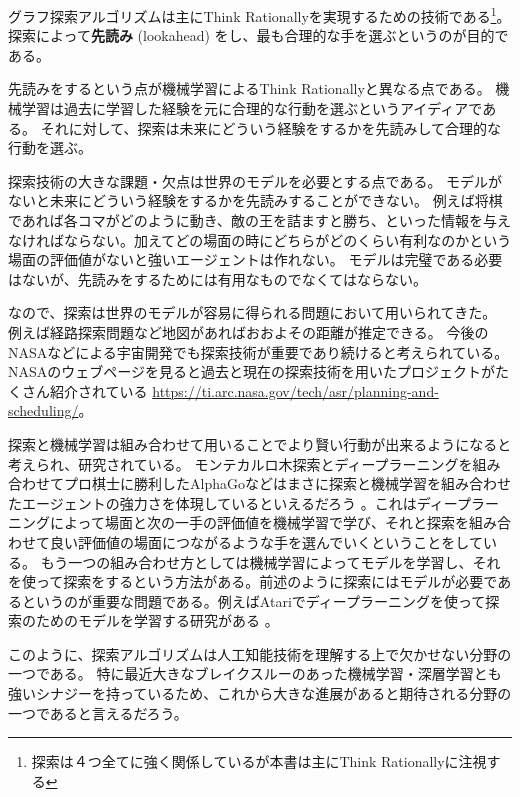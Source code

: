 \documentclass[10pt]{book}
\newcommand{\define}[2]{{\bf #1} (#2) \index{#1}\index{#2}}
\begin{document}
グラフ探索アルゴリズムは主にThink Rationallyを実現するための技術である\footnote{探索は４つ全てに強く関係しているが本書は主にThink Rationallyに注視する}。
探索によって\define{先読み}{lookahead}をし、最も合理的な手を選ぶというのが目的である。

先読みをするという点が機械学習によるThink Rationallyと異なる点である。
機械学習は過去に学習した経験を元に合理的な行動を選ぶというアイディアである。
それに対して、探索は未来にどういう経験をするかを先読みして合理的な行動を選ぶ。


探索技術の大きな課題・欠点は世界のモデルを必要とする点である。
モデルがないと未来にどういう経験をするかを先読みすることができない。
例えば将棋であれば各コマがどのように動き、敵の王を詰ますと勝ち、といった情報を与えなければならない。加えてどの場面の時にどちらがどのくらい有利なのかという場面の評価値がないと強いエージェントは作れない。
モデルは完璧である必要はないが、先読みをするためには有用なものでなくてはならない。

なので、探索は世界のモデルが容易に得られる問題において用いられてきた。
例えば経路探索問題など地図があればおおよその距離が推定できる。
今後のNASAなどによる宇宙開発でも探索技術が重要であり続けると考えられている。NASAのウェブページを見ると過去と現在の探索技術を用いたプロジェクトがたくさん紹介されている \url{https://ti.arc.nasa.gov/tech/asr/planning-and-scheduling/}。


探索と機械学習は組み合わせて用いることでより賢い行動が出来るようになると考えられ、研究されている。
モンテカルロ木探索とディープラーニングを組み合わせてプロ棋士に勝利したAlphaGoなどはまさに探索と機械学習を組み合わせたエージェントの強力さを体現しているといえるだろう \cite{silver2016mastering}。これはディープラーニングによって場面と次の一手の評価値を機械学習で学び、それと探索を組み合わせて良い評価値の場面につながるような手を選んでいくということをしている。
もう一つの組み合わせ方としては機械学習によってモデルを学習し、それを使って探索をするという方法がある。前述のように探索にはモデルが必要であるというのが重要な問題である。例えばAtariでディープラーニングを使って探索のためのモデルを学習する研究がある \cite{oh2015action,silver2016predictron,chiappa2017recurrent}。

このように、探索アルゴリズムは人工知能技術を理解する上で欠かせない分野の一つである。
特に最近大きなブレイクスルーのあった機械学習・深層学習とも強いシナジーを持っているため、これから大きな進展があると期待される分野の一つであると言えるだろう。

\end{document}
